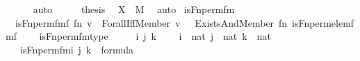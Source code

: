 \begin{isabellebody}
\ \ \ \ \isamarkupfalse%
\ auto\isanewline
\isanewline
\ \ \isamarkupfalse%
\ \isamarkupfalse%
\ {\isacharquery}{\kern0pt}thesis\ \isamarkupfalse%
\ {\isacartoucheopen}X\ {\isasymin}\ M{\isacartoucheclose}\ \isamarkupfalse%
\ auto\isanewline
{}\isamarkupfalse%
%
\endisatagproof
{\isafoldproof}%
%
\isadelimproof
\isanewline
%
\endisadelimproof
\isanewline
{}\isamarkupfalse%
\ is{\isacharunderscore}{\kern0pt}Fn{\isacharunderscore}{\kern0pt}perm{\isacharprime}{\kern0pt}{\isacharunderscore}{\kern0pt}fm\ \isanewline
\ \ {\isachardoublequoteopen}is{\isacharunderscore}{\kern0pt}Fn{\isacharunderscore}{\kern0pt}perm{\isacharprime}{\kern0pt}{\isacharunderscore}{\kern0pt}fm{\isacharparenleft}{\kern0pt}f{\isacharcomma}{\kern0pt}\ fn{\isacharcomma}{\kern0pt}\ v{\isacharparenright}{\kern0pt}\ {\isasymequiv}\ Forall{\isacharparenleft}{\kern0pt}Iff{\isacharparenleft}{\kern0pt}Member{\isacharparenleft}{\kern0pt}{}{\isacharcomma}{\kern0pt}\ v\ {\isacharhash}{\kern0pt}{\isacharplus}{\kern0pt}\ {}{\isacharparenright}{\kern0pt}{\isacharcomma}{\kern0pt}\ Exists{\isacharparenleft}{\kern0pt}And{\isacharparenleft}{\kern0pt}Member{\isacharparenleft}{\kern0pt}{}{\isacharcomma}{\kern0pt}\ fn{\isacharhash}{\kern0pt}{\isacharplus}{\kern0pt}{}{\isacharparenright}{\kern0pt}{\isacharcomma}{\kern0pt}\ is{\isacharunderscore}{\kern0pt}Fn{\isacharunderscore}{\kern0pt}perm{\isacharprime}{\kern0pt}{\isacharunderscore}{\kern0pt}elem{\isacharunderscore}{\kern0pt}fm{\isacharparenleft}{\kern0pt}f{\isacharhash}{\kern0pt}{\isacharplus}{\kern0pt}{}{\isacharcomma}{\kern0pt}\ {}{\isacharcomma}{\kern0pt}\ {}{\isacharparenright}{\kern0pt}{\isacharparenright}{\kern0pt}{\isacharparenright}{\kern0pt}{\isacharparenright}{\kern0pt}{\isacharparenright}{\kern0pt}{\isachardoublequoteclose}\ \isanewline
\isanewline
{}\isamarkupfalse%
\ is{\isacharunderscore}{\kern0pt}Fn{\isacharunderscore}{\kern0pt}perm{\isacharprime}{\kern0pt}{\isacharunderscore}{\kern0pt}fm{\isacharunderscore}{\kern0pt}type\ {\isacharcolon}{\kern0pt}\ \isanewline
\ \ \ i\ j\ k\ \isanewline
\ \ \ {\isachardoublequoteopen}i\ {\isasymin}\ nat{\isachardoublequoteclose}\ {\isachardoublequoteopen}j\ {\isasymin}\ nat{\isachardoublequoteclose}\ {\isachardoublequoteopen}k\ {\isasymin}\ nat{\isachardoublequoteclose}\ \isanewline
\ \ \ {\isachardoublequoteopen}is{\isacharunderscore}{\kern0pt}Fn{\isacharunderscore}{\kern0pt}perm{\isacharprime}{\kern0pt}{\isacharunderscore}{\kern0pt}fm{\isacharparenleft}{\kern0pt}i{\isacharcomma}{\kern0pt}\ j{\isacharcomma}{\kern0pt}\ k{\isacharparenright}{\kern0pt}\ {\isasymin}\ formula{\isachardoublequoteclose}\ \isanewline

\end{isabellebody}
